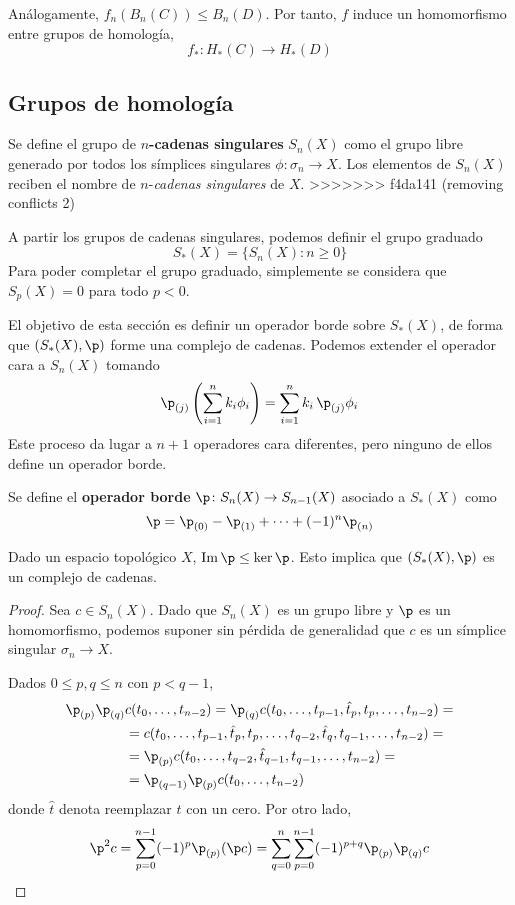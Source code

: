 \begin{proposition}
Análogamente, $f_n(B_n(C)) \leq B_n(D)$. Por tanto, $f$ induce un homomorfismo
entre grupos de homología,
\[f_*\colon H_*(C) \to H_*(D)\]

\subsection{Grupos de homología}
\begin{definition}
Se define el grupo de \textbf{$n$-cadenas
singulares} $S_n(X)$ como el grupo libre generado por todos los símplices
singulares $\phi\colon \sigma_n \to X$. Los elementos de $S_n(X)$
reciben el nombre de $n$-\emph{cadenas singulares} de $X$.
>>>>>>> f4da141 (removing conflicts 2)
\end{definition}

A partir los grupos de cadenas singulares, podemos definir el grupo graduado
	\[S_*(X)=\{S_n(X): n \geq 0\}\]
Para poder completar el grupo graduado, simplemente se considera que $S_p(X)=0$ para todo $p < 0$.

El objetivo de esta sección es definir un operador borde sobre $S_*(X)$, de forma que $(S_*(X),\p)$ forme una complejo de cadenas.
Podemos extender el operador cara a $S_n(X)$ tomando
	\[\p_{(j)}\left(\sum_{i=1}^n k_i\phi_i\right)= \sum^n_{i=1}k_i\,\p_{(j)}\phi_i\]
Este proceso da lugar a $n+1$ operadores cara diferentes, pero ninguno de ellos define un operador borde.

\begin{definition}
	Se define el \textbf{operador borde} $\p\colon S_n(X) \to S_{n-1}(X)$ asociado a $S_*(X)$ como
		\[\p=\p_{(0)}-\p_{(1)}+\dots+(-1)^n\p_{(n)}\]
\end{definition}

\begin{theorem}
Dado un espacio topológico $X$, $\im \p \leq \ker \p$.
Esto implica que $(S_*(X), \p)$ es un complejo de cadenas.
\end{theorem}

\begin{proof}
Sea $c \in S_n(X)$.
Dado que $S_n(X)$ es un grupo libre y $\p$ es un homomorfismo, podemos suponer sin pérdida de generalidad que $c$ es un símplice singular $\sigma_n \to X$.

Dados $0 \leq p, q \leq n$ con $p < q-1$,
\begin{align*}
\p_{(p)}\p_{(q)}&c(t_0,\dots,t_{n-2})
	=\p_{(q)}c(t_0,\dots,t_{p-1},\hat t_p,t_p,\dots,t_{n-2})=\\
	&=c(t_0,\dots,t_{p-1},\hat t_p,t_p,\dots,t_{q-2},\hat t_q,t_{q-1},\dots,t_{n-2})=\\
	&=\p_{(p)}c(t_0,\dots,t_{q-2},\hat t_{q-1},t_{q-1},\dots,t_{n-2})=\\
	&=\p_{(q-1)}\p_{(p)}c(t_0,\dots,t_{n-2})
\end{align*}
donde $\hat t$ denota reemplazar $t$ con un cero.
Por otro lado,
\begin{equation}
	\label{Borde2c}
	\p^2c=\sum^{n-1}_{p=0}(-1)^p\p_{(p)}(\p c)=\sum^n_{q=0}\sum^{n-1}_{p=0}(-1)^{p+q}\p_{(p)}\p_{(q)}c
\end{equation}


\end{proof}
\end{proposition}
